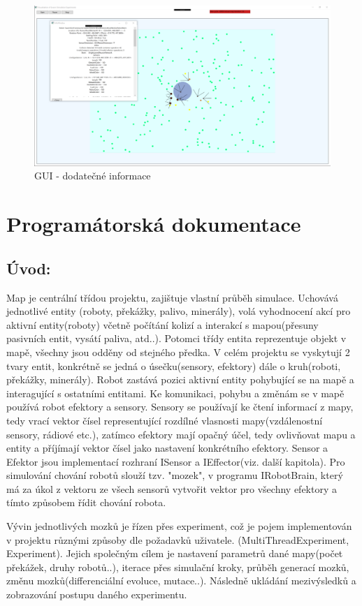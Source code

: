 \documentclass[12pt, oneside]{article}
\begin{document}
\begin{figure}[h]\centering
	\includegraphics[width=\columnwidth]{img/info_click.png}
	\caption{GUI - dodatečné informace} 
\end{figure}
\clearpage 
\clearpage
\section{Programátorská dokumentace}
\subsection{Úvod:}
Map je centrální třídou projektu, zajištuje vlastní průběh simulace. Uchovává jednotlivé entity (roboty,  překážky, palivo, minerály), volá vyhodnocení akcí pro aktivní entity(roboty) včetně počítání kolizí a interakcí s mapou(přesuny pasivních entit, vysátí paliva, atd..). Potomci třídy entita reprezentuje objekt v mapě, všechny jsou  odděny od stejného předka. V celém projektu se vyskytují 2 tvary entit, konkrétně se jedná o úsečku(sensory, efektory) dále o kruh(roboti, překážky, minerály). Robot zastává pozici aktivní entity pohybující se na mapě a interagující s ostatními entitami. Ke komunikaci, pohybu a změnám se v mapě používá robot efektory a sensory. Sensory se používají ke čtení informací z mapy, tedy vrací vektor čísel representující rozdílné vlasnosti mapy(vzdálenostní sensory, rádiové etc.), zatímco efektory mají opačný účel, tedy ovlivňovat mapu a entity a příjímají vektor čísel jako nastavení konkrétního efektory. Sensor a Efektor jsou implementací rozhraní ISensor a IEffector(viz. další kapitola). Pro simulování chování robotů slouží tzv. "mozek", v programu IRobotBrain, který má za úkol z vektoru ze všech sensorů vytvořit vektor pro všechny efektory a tímto způsobem řídit chování robota. \par
Vývin jednotlivých mozků je řízen přes experiment, což je pojem implementován v projektu různými způsoby dle požadavků uživatele. (MultiThreadExperiment, Experiment). Jejich společným cílem je nastavení parametrů dané mapy(počet překážek, druhy robotů..), iterace přes simulační kroky, průběh generací mozků, změnu mozků(differenciální evoluce, mutace..). Následně ukládání mezivýsledků a zobrazování postupu daného experimentu. 
\end{document}
